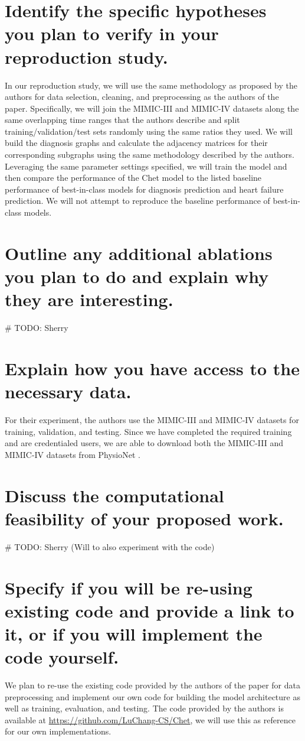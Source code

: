\documentclass[11pt,a4paper]{article}
\begin{document}
\section{Identify the specific hypotheses you plan to verify in your
reproduction study.}
In our reproduction study, we will use the same methodology as proposed by the
authors for data selection, cleaning, and preprocessing as the authors of the
paper. Specifically, we will join the MIMIC-III and MIMIC-IV datasets along the
same overlapping time ranges that the authors describe and split
training/validation/test sets randomly using the same ratios they used. We will
build the diagnosis graphs and calculate the adjacency matrices for their
corresponding subgraphs using the same methodology described by the authors.
Leveraging the same parameter settings specified, we will train the model and
then compare the performance of the Chet model to the listed
baseline performance of best-in-class models for diagnosis prediction and heart
failure prediction. We will not attempt to reproduce the baseline performance of
best-in-class models.

\section{Outline any additional ablations you plan to do and
explain why they are interesting.}
\# TODO: Sherry

\section{Explain how you have access to the necessary data.}
For their experiment, the authors use the MIMIC-III \cite{mimic3} and MIMIC-IV
\cite{mimic4} datasets for training, validation, and testing. Since we have
completed the required training and are credentialed users, we are able to
download both the MIMIC-III and MIMIC-IV datasets from PhysioNet
\cite{physionet}.

\section{Discuss the computational feasibility of your proposed work.}
\# TODO: Sherry (Will to also experiment with the code)

\section{Specify if you will be re-using existing code and provide a link to it,
or if you will implement the code yourself.} 
We plan to re-use the existing code provided by the authors of the paper for
data preprocessing and implement our own code for building the model
architecture as well as training, evaluation, and testing. The code provided by
the authors is available at \url {https://github.com/LuChang-CS/Chet}, we will
use this as reference for our own implementations.




\end{document}
